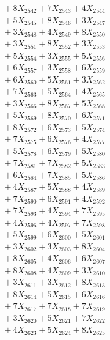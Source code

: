 \documentclass[a4paper,10pt]{article}
\begin{document}
{\begin{align}
&\;  + 8 X_{2542} + 7 X_{2543} + 4 X_{2544} \\[0.3ex]
&\;  + 5 X_{2545} + 8 X_{2546} + 3 X_{2547} \\[0.3ex]
&\;  + 3 X_{2548} + 4 X_{2549} + 8 X_{2550} \\[0.3ex]
&\;  + 3 X_{2551} + 8 X_{2552} + 3 X_{2553} \\[0.3ex]
&\;  + 5 X_{2554} + 3 X_{2555} + 5 X_{2556} \\[0.3ex]
&\;  + 6 X_{2557} + 3 X_{2558} + 6 X_{2559} \\[0.5ex]\allowbreak
&\;  + 6 X_{2560} + 5 X_{2561} + 3 X_{2562} \\[0.3ex]
&\;  + 7 X_{2563} + 5 X_{2564} + 4 X_{2565} \\[0.3ex]
&\;  + 3 X_{2566} + 8 X_{2567} + 5 X_{2568} \\[0.3ex]
&\;  + 5 X_{2569} + 8 X_{2570} + 6 X_{2571} \\[0.3ex]
&\;  + 8 X_{2572} + 6 X_{2573} + 5 X_{2574} \\[0.3ex]
&\;  + 7 X_{2575} + 6 X_{2576} + 4 X_{2577} \\[0.3ex]
&\;  + 5 X_{2578} + 6 X_{2579} + 5 X_{2580} \\[0.3ex]
&\;  + 7 X_{2581} + 7 X_{2582} + 5 X_{2583} \\[0.3ex]
&\;  + 6 X_{2584} + 7 X_{2585} + 5 X_{2586} \\[0.3ex]
&\;  + 4 X_{2587} + 5 X_{2588} + 4 X_{2589} \\[0.5ex]\allowbreak
&\;  + 7 X_{2590} + 6 X_{2591} + 4 X_{2592} \\[0.3ex]
&\;  + 7 X_{2593} + 4 X_{2594} + 7 X_{2595} \\[0.3ex]
&\;  + 4 X_{2596} + 4 X_{2597} + 7 X_{2598} \\[0.3ex]
&\;  + 5 X_{2599} + 6 X_{2600} + 5 X_{2601} \\[0.3ex]
&\;  + 3 X_{2602} + 3 X_{2603} + 8 X_{2604} \\[0.3ex]
&\;  + 8 X_{2605} + 4 X_{2606} + 6 X_{2607} \\[0.3ex]
&\;  + 8 X_{2608} + 4 X_{2609} + 3 X_{2610} \\[0.3ex]
&\;  + 3 X_{2611} + 3 X_{2612} + 8 X_{2613} \\[0.3ex]
&\;  + 8 X_{2614} + 5 X_{2615} + 6 X_{2616} \\[0.3ex]
&\;  + 7 X_{2617} + 7 X_{2618} + 7 X_{2619} \\[0.5ex]\allowbreak
&\;  + 3 X_{2620} + 5 X_{2621} + 7 X_{2622} \\[0.3ex]
&\;  + 4 X_{2623} + 5 X_{2624} + 8 X_{2625} \\[0.3ex]

\end{align}}
\end{document}

